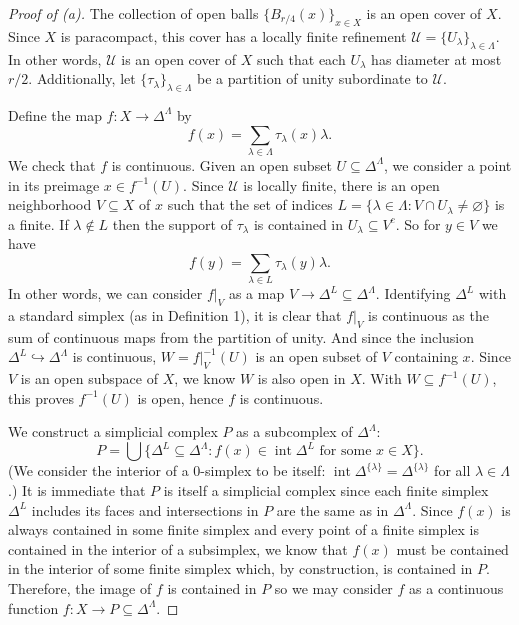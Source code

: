 \documentclass[12pt]{article}
\theoremstyle{definition}
\renewcommand{\emptyset}{\varnothing}
\newcommand{\<}{\langle}
\renewcommand{\>}{\rangle}
\newcommand{\UU}{\mathcal{U}}
\newcommand{\inc}{\hookrightarrow}
\DeclareMathOperator{\inter}{int}
\begin{document}
\begin{proof}[Proof of (a)]
    The collection of open balls $\{B_{r/4}(x)\}_{x \in X}$ is an open cover of $X$.
    Since $X$ is paracompact, this cover has a locally finite refinement $\UU = \{U_\lambda\}_{\lambda \in \Lambda}$.
    In other words, $\UU$ is an open cover of $X$ such that each $U_\lambda$ has diameter at most $r/2$.
    Additionally, let $\{\tau_\lambda\}_{\lambda \in \Lambda}$ be a partition of unity subordinate to $\UU$.

    Define the map $f : X \to \Delta^\Lambda$ by
    \[
        f(x) = \sum_{\lambda \in \Lambda} \tau_\lambda(x) \lambda.
    \]
    We check that $f$ is continuous.
    Given an open subset $U \subseteq \Delta^\Lambda$, we consider a point in its preimage $x \in f^{-1}(U)$.
    Since $\UU$ is locally finite, there is an open neighborhood $V \subseteq X$ of $x$ such that the set of indices $L = \{\lambda \in \Lambda : V \cap U_\lambda \ne \emptyset\}$ is a finite.
    If $\lambda \notin L$ then the support of $\tau_\lambda$ is contained in $U_\lambda \subseteq V^c$.
    So for $y \in V$ we have
    \[
        f(y) = \sum_{\lambda \in L} \tau_\lambda(y) \lambda.
    \]
    In other words, we can consider $f|_V$ as a map $V \to \Delta^L \subseteq \Delta^\Lambda$.
    Identifying $\Delta^L$ with a standard simplex (as in Definition 1), it is clear that $f|_V$ is continuous as the sum of continuous maps from the partition of unity.
    And since the inclusion $\Delta^L \inc \Delta^\Lambda$ is continuous, $W = f|_V^{-1}(U)$ is an open subset of $V$ containing $x$.
    Since $V$ is an open subspace of $X$, we know $W$ is also open in $X$.
    With $W \subseteq f^{-1}(U)$, this proves $f^{-1}(U)$ is open, hence $f$ is continuous.

    We construct a simplicial complex $P$ as a subcomplex of $\Delta^\Lambda$:
    \[
        P = \bigcup\big\{\Delta^L \subseteq \Delta^\Lambda : f(x) \in \inter \Delta^L \text{ for some } x \in X\big\}.
    \]
    (We consider the interior of a $0$-simplex to be itself: $\inter \Delta^{\{\lambda\}} = \Delta^{\{\lambda\}}$ for all $\lambda \in \Lambda$.)
    It is immediate that $P$ is itself a simplicial complex since each finite simplex $\Delta^L$ includes its faces and intersections in $P$ are the same as in $\Delta^\Lambda$.
    Since $f(x)$ is always contained in some finite simplex and every point of a finite simplex is contained in the interior of a subsimplex, we know that $f(x)$ must be contained in the interior of some finite simplex which, by construction, is contained in $P$.
    Therefore, the image of $f$ is contained in $P$ so we may consider $f$ as a continuous function $f : X \to P \subseteq \Delta^\Lambda$.


\end{proof}
\end{document}
